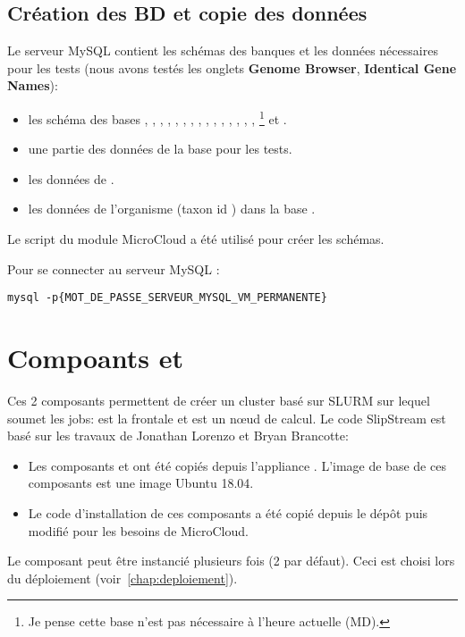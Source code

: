 \subsection{Création des BD et copie des données}

Le serveur MySQL contient les schémas des banques et les données nécessaires pour les tests (nous avons testés les onglets \textbf{Genome Browser}, \textbf{Identical Gene Names}):
\begin{itemize}
    \item les schéma des bases , , , , , , , ,
          , , , , , , , \footnote{Je pense cette base n'est pas nécessaire à l'heure actuelle (MD).}
          et .
    \item une partie des données de la base  pour les tests.
    \item les données de .
    \item les données de l'organisme \theOrg{} (taxon id \theTaxID{}) dans la base .
\end{itemize}

Le script  du module MicroCloud a été utilisé pour créer les schémas.

Pour se connecter au serveur MySQL :
\begin{lstlisting}[style=bash]
mysql -p{MOT_DE_PASSE_SERVEUR_MYSQL_VM_PERMANENTE}
\end{lstlisting}

\section{Compoants  et } \label{master&slave}

Ces 2 composants permettent de créer un cluster basé sur SLURM sur lequel  soumet les jobs:
 est la frontale et  est un nœud de calcul.
Le code SlipStream est basé sur les travaux de Jonathan Lorenzo et Bryan Brancotte:
\begin{itemize}
    \item Les composants  et  ont été copiés depuis
    l'appliance \href{https://nuv.la/module/ifb/devzone/jlorenzo/cluster/Slurm_Cluster_ubuntu18}{}.
          L'image de base de ces composants est une image Ubuntu 18.04.
    \item Le code d'installation de ces composants a été copié depuis le dépôt 
          puis modifié pour les besoins de MicroCloud.
\end{itemize}
Le composant  peut être instancié plusieurs fois (2 par défaut).
Ceci est choisi lors du déploiement (voir~\autoref{chap:deploiement}).

